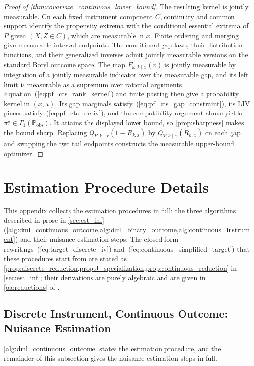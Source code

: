 \begin{proof}[Proof of \cref{thm:covariate_continuous_lower_bound}]
The resulting kernel is jointly measurable. On each fixed instrument component $C$, continuity and common support identify the propensity extrema with the conditional essential extrema of $P$ given $(X,Z\in C)$, which are measurable in $x$. Finite ordering and merging give measurable interval endpoints. The conditional gap laws, their distribution functions, and their generalized inverses admit jointly measurable versions on the standard Borel outcome space. The map $F_{\omega,k\mid x}(v)$ is jointly measurable by integration of a jointly measurable indicator over the measurable gap, and its left limit is measurable as a supremum over rational arguments. Equation~(\ref{eq:pf_cts_rank_kernel}) and finite pasting then give a probability kernel in $(x,u)$. Its gap marginals satisfy~(\ref{eq:pf_cts_gap_constraint}), its LIV pieces satisfy~(\ref{eq:pf_cts_deriv}), and the compatibility argument above yields $\pi_1^\star\in\Gamma_1(\mathbb P_{\mathrm{obs}})$. It attains the displayed lower bound, so \cref{prop:sharpness} makes the bound sharp. Replacing $Q_{Y,k\mid x}(1-R_{k,x})$ by $Q_{Y,k\mid x}(R_{k,x})$ on each gap and swapping the two tail endpoints constructs the measurable upper-bound optimizer.
\end{proof}

\section{Estimation Procedure Details}\label{app:procedure_details}

This appendix collects the estimation procedures in full: the three algorithms described in prose in \cref{sec:est_inf} (\cref{alg:dml_continuous_outcome,alg:dml_binary_outcome,alg:continuous_instrument}) and their nuisance-estimation steps. The closed-form rewritings~(\ref{eq:target_discrete_iv}) and~(\ref{eq:continuous_simplified_target}) that these procedures start from are stated as \cref{prop:discrete_reduction,prop:J_specialization,prop:continuous_reduction} in \cref{sec:est_inf}; their derivations are purely algebraic and are given in \cref{oa:reductions} of \oalocation.

\subsection{Discrete Instrument, Continuous Outcome: Nuisance Estimation}\label{app:procedure_continuous_outcome}

\cref{alg:dml_continuous_outcome} states the estimation procedure, and the remainder of this subsection gives the nuisance-estimation steps in full.

